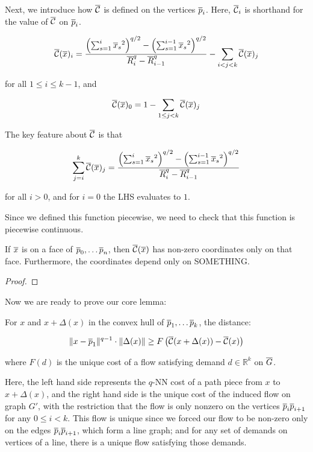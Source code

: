 Next, we introduce how $\overline{\mathcal{C}}$ is defined on the vertices $\overline{p}_{i}$. Here,
$\overline{\mathcal{C}}_i$ is shorthand for the value of $\overline{\mathcal{C}}$ on $\overline{p}_{i}$.

\begin{align}
\overline{\mathcal{C}}(\overline{x})_i = \frac{
\left(\sum_{s=1}^i {\overline{x}_s}^2\right)^{q/2} -\left(\sum_{s=1}^{i-1}
{\overline{x}_s}^2\right)^{q/2}
}
{
\overline{R}_i^q - \overline{R}_{i-1}^q
} - \sum_{i < j < k} \overline{\mathcal{C}}(\overline{x})_j
\end{align}

for all $1 \leq i \leq k-1$, and

\[ \overline{\mathcal{C}}(\overline{x})_0 = 1 - \sum_{1 \leq j < k} \overline{\mathcal{C}}(\overline{x})_j
\]

The key feature about $\overline{\mathcal{C}}$ is that

\[\sum_{j=i}^k \overline{\mathcal{C}}(\overline{x})_j= \frac{
\left(\sum_{s=1}^i {\overline{x}_s}^2\right)^{q/2} -\left(\sum_{s=1}^{i-1}
{\overline{x}_s}^2\right)^{q/2}
}
{
\overline{R}_i^q - \overline{R}_{i-1}^q
}\]

for all $i > 0$, and for $i = 0$ the LHS evaluates to $1$.

Since we defined this function piecewise, we need to check that this
function is piecewise continuous.

\begin{lemma} If $\overline{x}$ is on a face of $\overline{p}_0, \ldots \overline{p}_n$, then
$\overline{\mathcal{C}}(\overline{x})$ has non-zero coordinates only on that face. Furthermore, the
coordinates depend only on SOMETHING.

\end{lemma}

\begin{proof}

\end{proof}

Now we are ready to prove our core lemma:

\begin{lemma} For $x$ and $x+\Delta(x)$ in the convex hull of $\overline{p}_1,
\ldots \overline{p}_k$, the distance:

\[ \|x-\overline{p}_1\|^{q-1} \cdot \|\Delta(x)\| \geq
F\left(\overline{\mathcal{C}}(x+\Delta(x))-\overline{\mathcal{C}}(x)\right)\]

where $F(d)$ is the unique cost of a flow satisfying demand $d \in
\mathbb{R}^k$ on $\overline{G}$.

\end{lemma}

Here, the left hand side represents the $q$-NN cost of a path piece from
$x$ to $x+\Delta(x)$, and the right hand side is the unique cost of the
induced flow on graph $G'$, with the restriction that the flow is only
nonzero on the vertices $\overline{p}_i\overline{p}_{i+1}$ for any $0 \leq i < k$. This flow
is unique since we forced our flow to be non-zero only on the edges
$\overline{p}_i\overline{p}_{i+1}$, which form a line graph; and for any set of demands on
vertices of a line, there is a unique flow satisfying those demands.


